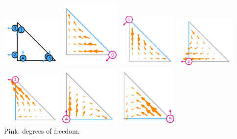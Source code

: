 \begin{itemize}
\begin{center}
\includegraphics[width=3cm]{images/pair_bdm/element-Brezzi-Douglas-Marini-variant-equispaced-triangle-1-dofs}
\includegraphics[width=3cm]{images/pair_bdm/element-Brezzi-Douglas-Marini-variant-equispaced-triangle-1-0}
\includegraphics[width=3cm]{images/pair_bdm/element-Brezzi-Douglas-Marini-variant-equispaced-triangle-1-1}
\includegraphics[width=3cm]{images/pair_bdm/element-Brezzi-Douglas-Marini-variant-equispaced-triangle-1-2}\\
\includegraphics[width=3cm]{images/pair_bdm/element-Brezzi-Douglas-Marini-variant-equispaced-triangle-1-3}
\includegraphics[width=3cm]{images/pair_bdm/element-Brezzi-Douglas-Marini-variant-equispaced-triangle-1-4}
\includegraphics[width=3cm]{images/pair_bdm/element-Brezzi-Douglas-Marini-variant-equispaced-triangle-1-5}\\
{\captionfont Pink: degrees of freedom.}
\end{center}



\end{itemize}
